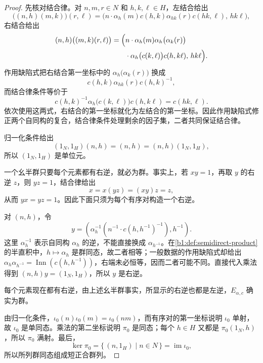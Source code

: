 \begin{proof}
	先核对结合律。对 \(n,m,r\in N\) 和 \(h,k,\ell\in H\)，左结合给出
	\[
		\bigl((n,h)(m,k)\bigr)(r,\ell) =\bigl(n\cdot\alpha_h(m)c(h,k)\alpha_{hk}(r)c(hk,\ell),\,hk\ell\bigr),
	\]
	右结合给出
	\[
		\begin{aligned}
			(n,h)\bigl((m,k)(r,\ell)\bigr) =\Bigl(&n\cdot\alpha_h(m)\alpha_h\bigl(\alpha_k(r)\bigr)\\
			&{}\cdot\alpha_h\bigl(c(k,\ell)\bigr)c(h,k\ell),\,hk\ell\Bigr).
		\end{aligned}
	\]
	作用缺陷式把右结合第一坐标中的 \(\alpha_h\bigl(\alpha_k(r)\bigr)\) 换成
	\[
		c(h,k)\alpha_{hk}(r)c(h,k)^{-1},
	\]
	而结合律条件等价于
	\[
		c(h,k)^{-1}\alpha_h\bigl(c(k,\ell)\bigr)c(h,k\ell) =c(hk,\ell).
	\]
	依次使用这两式，右结合的第一坐标就化为左结合的第一坐标。因此作用缺陷式修正两个自同构的复合，结合律条件处理剩余的因子集，二者共同保证结合律。

	归一化条件给出
	\[
		(1_N,1_H)(n,h)=(n,h)=(n,h)(1_N,1_H),
	\]
	所以 \((1_N,1_H)\) 是单位元。

	一个幺半群只要每个元素都有右逆，就必为群。事实上，若 \(xy=1\)，再取 \(y\) 的右逆 \(z\)，则 \(yz=1\)，结合律给出
	\[
		x=x(yz)=(xy)z=z,
	\]
	从而 \(yx=yz=1\)。因此下面只须为每个有序对构造一个右逆。

	\begin{samepage}
		对 \((n,h)\)，令
		\[
			y=\left( \alpha_h^{-1}\!\left(n^{-1}\cdot c(h,h^{-1})^{-1}\right), h^{-1} \right).
		\]
		这里 \(\alpha_h^{-1}\) 表示自同构 \(\alpha_h\) 的逆，不能直接换成 \(\alpha_{h^{-1}}\)。在\cref{b1:def:semidirect-product}的半直积中，\(h\mapsto\alpha_h\) 是群同态，故二者相等；一般数据的作用缺陷式却给出 \(\alpha_h\alpha_{h^{-1}}=\operatorname{Inn}(c(h,h^{-1}))\)，右端未必恒等，因而二者可能不同。直接代入乘法得到 \((n,h)y=(1_N,1_H)\)，所以 \(y\) 是右逆。
	\end{samepage}

	每个元素现在都有右逆，由上述幺半群事实，所显示的右逆也都是左逆，\(E_{\alpha,c}\) 确实为群。

	由归一化条件，\(\iota_0(n)\iota_0(m)=\iota_0(nm)\)，而有序对的第一坐标说明 \(\iota_0\) 单射，故 \(\iota_0\) 是单同态。乘法的第二坐标说明 \(\pi_0\) 是同态；每个 \(h\in H\) 又都是 \(\pi_0(1_N,h)\)，所以 \(\pi_0\) 满射。最后，
	\[
		\ker\pi_0=\{\,(n,1_H)\mid n\in N\,\}=\operatorname{im}\iota_0,
	\]
	所以所列群同态组成短正合群列。
\end{proof}

